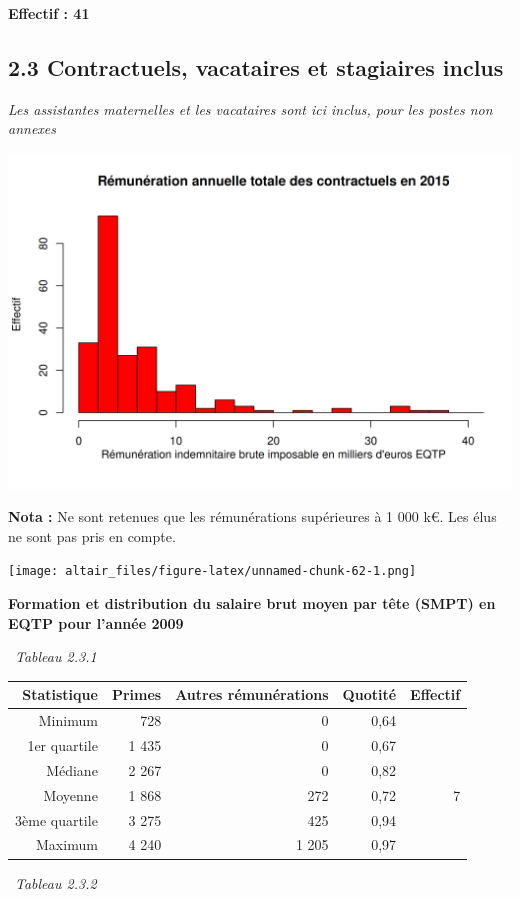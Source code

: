 \textbf{Effectif : 41 }

\hypertarget{contractuels-vacataires-et-stagiaires-inclus}{%
\subsection{2.3 Contractuels, vacataires et stagiaires
inclus}\label{contractuels-vacataires-et-stagiaires-inclus}}

\emph{Les assistantes maternelles et les vacataires sont ici inclus,
pour les postes non annexes}

\includegraphics{altair_files/figure-latex/unnamed-chunk-61-1.png}

\textbf{Nota :} Ne sont retenues que les rémunérations supérieures à 1
000 k€. Les élus ne sont pas pris en compte.

\texttt{[image: altair\_files/figure-latex/unnamed-chunk-62-1.png]}

\textbf{Formation et distribution du salaire brut moyen par tête (SMPT)
en EQTP pour l'année 2009 }

~\emph{Tableau 2.3.1}

\begin{longtable}[]{@{}rrrrr@{}}
\toprule
Statistique & Primes & Autres rémunérations & Quotité &
Effectif\tabularnewline
\midrule
\endhead
Minimum & 728 & 0 & 0,64 &\tabularnewline
1er quartile & 1 435 & 0 & 0,67 &\tabularnewline
Médiane & 2 267 & 0 & 0,82 &\tabularnewline
Moyenne & 1 868 & 272 & 0,72 & 7\tabularnewline
3ème quartile & 3 275 & 425 & 0,94 &\tabularnewline
Maximum & 4 240 & 1 205 & 0,97 &\tabularnewline
\bottomrule
\end{longtable}

~\emph{Tableau 2.3.2}

